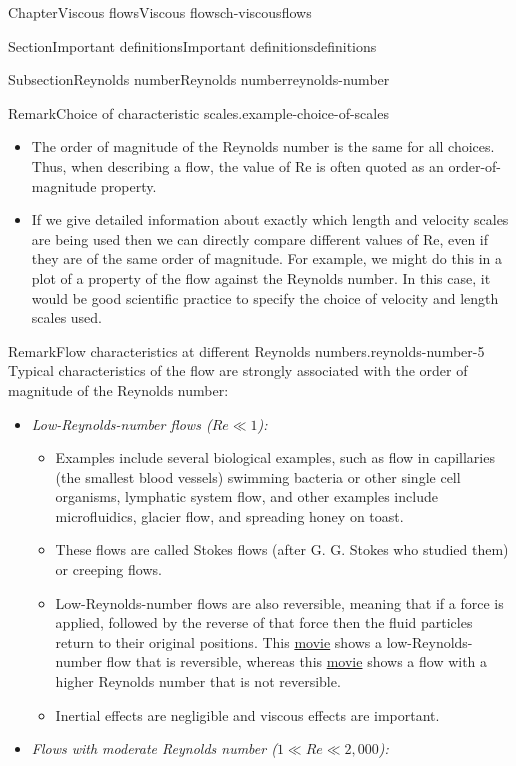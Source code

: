 \documentclass[oneside,10pt,]{book}
\numberwithin{equation}{section}
\begin{document}
\begin{chapterptx}{Chapter}{Viscous flows}{}{Viscous flows}{}{}{ch-viscousflows}
\begin{sectionptx}{Section}{Important definitions}{}{Important definitions}{}{}{definitions}
\begin{subsectionptx}{Subsection}{Reynolds number}{}{Reynolds number}{}{}{reynolds-number}
\begin{remark}{Remark}{Choice of characteristic scales.}{example-choice-of-scales}
\begin{itemize}[label=\textbullet]
\item{}The order of magnitude of the Reynolds number is the same for all choices. Thus, when describing a flow, the value of \(\textrm{Re}\) is often quoted as an order-of-magnitude property.%
\item{}If we give detailed information about exactly which length and velocity scales are being used then we can directly compare different values of \(\textrm{Re}\), even if they are of the same order of magnitude. For example, we might do this in a plot of a property of the flow against the Reynolds number. In this case, it would be good scientific practice to specify the choice of velocity and length scales used.%
\end{itemize}
%
\end{remark}
\begin{remark}{Remark}{Flow characteristics at different Reynolds numbers.}{reynolds-number-5}%
Typical characteristics of the flow are strongly associated with the order of magnitude of the Reynolds number:%
\begin{itemize}[label=\textbullet]
\item{}\emph{Low-Reynolds-number flows (\(Re \ll 1\)):}%
\begin{itemize}[label=$\circ$]
\item{}Examples include several biological examples, such as flow in capillaries (the smallest blood vessels) swimming bacteria or other single cell organisms, lymphatic system flow, and other examples include microfluidics, glacier flow, and spreading honey on toast.%
\item{}These flows are called Stokes flows (after G. G. Stokes who studied them) or creeping flows.%
\item{}Low-Reynolds-number flows are also reversible, meaning that if a force is applied, followed by the reverse of that force then the fluid particles return to their original positions. This \href{https://www-cambridge-org.ezproxy1.bath.ac.uk/core/homsy/category/95}{movie} shows a low-Reynolds-number flow that is reversible, whereas this \href{https://www-cambridge-org.ezproxy1.bath.ac.uk/core/homsy/category/96}{movie} shows a flow with a higher Reynolds number that is not reversible.%
\item{}Inertial effects are negligible and viscous effects are important.%
\end{itemize}
%
\item{}\emph{Flows with moderate Reynolds number (\(1 \ll Re \ll 2{,}000\)):}%

\end{itemize}
\end{remark}
\end{subsectionptx}
\end{sectionptx}
\end{chapterptx}
\end{document}
